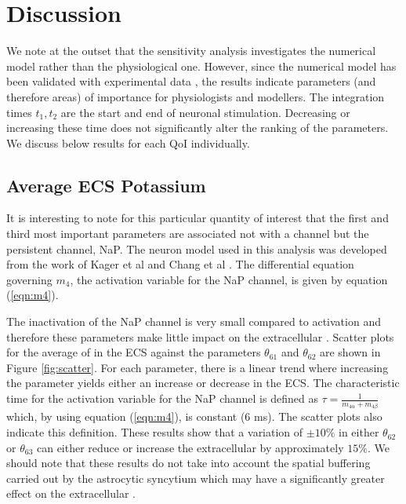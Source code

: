 \section{Discussion}
We  note at the outset that the sensitivity analysis investigates the numerical model rather than the physiological one. However, since the numerical model has been validated with experimental data  \cite{Dormanns2015,Mathias2018},  the results indicate parameters (and therefore areas) of importance for physiologists and modellers. The integration times $t_1,t_2$ are the start and end of neuronal stimulation. Decreasing or increasing these time does not significantly alter the ranking of the parameters. We discuss below results for each QoI individually. 


\subsection{Average ECS Potassium}
It is interesting to note for this particular quantity of interest that the first and third most important parameters are associated not with a \pot channel but the persistent \na channel, NaP.  The neuron model used in this analysis was developed from the work of Kager et al \cite{Kager2000a} and Chang et al \cite{Chang2013}.
The differential equation governing $m_4$,  the activation variable for the NaP channel, is given by equation (\ref{eqn:m4}).

The inactivation of the NaP channel is very small compared to activation and therefore these parameters make little impact on the extracellular \pot. 
Scatter plots for the average of \pot in the  ECS against the parameters $\theta_{61}$ and $\theta_{62}$ are shown in Figure \ref{fig:scatter}.  For each parameter, there is a linear trend where increasing the parameter yields either an increase or decrease in the \pot ECS. The characteristic time for the activation variable for the NaP channel is defined as $\tau=\frac{1}{m_{4 \alpha}+m_{4 \beta}}$ which, by using equation (\ref{eqn:m4}), is constant (6 ms). The scatter plots also indicate this definition. These results show that a variation of $\pm 10 \%$ in either $\theta_{62}$ or $\theta_{63}$ can either reduce or increase the extracellular \pot  by approximately $15 \%$. We should note that these results do not take into account the spatial buffering carried out by the astrocytic syncytium which may have a significantly greater effect on the extracellular \pot \cite{Bellot-Saez2017,Kenny2018b}. 

